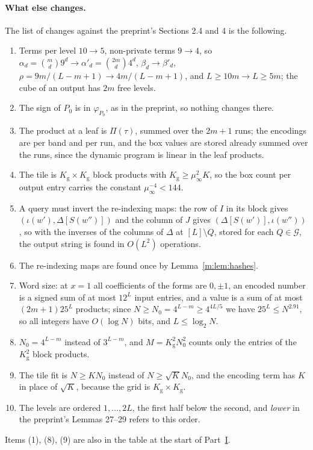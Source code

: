\documentclass[11pt]{article}
\theoremstyle{definition}
\theoremstyle{remark}
\newcommand{\Nz}{N_0}
\newcommand{\Qg}{\mathcal{G}}
\newcommand{\Kg}{K_{\mathrm g}}
\begin{document}
\paragraph{What else changes.} The list of changes against the preprint's Sections 2.4 and 4 is the following.
\begin{enumerate}[label=(\arabic*),nosep]
\item Terms per level $10\to5$, non-private terms $9\to4$, so $\alpha_d=\binom md9^d\to\alpha'_d=\binom{2m}d4^d$, $\beta_d\to\beta'_d$, $\rho=9m/(L-m+1)\to4m/(L-m+1)$, and $L\ge10m\to L\ge5m$; the cube of an output has $2m$ free levels.
\item The sign of $P_0$ is in $\varphi_{P_0}$, as in the preprint, so nothing changes there.
\item The product at a leaf is $\Pi(\tau)$, summed over the $2m+1$ runs; the encodings are per band and per run, and the box values are stored already summed over the runs, since the dynamic program is linear in the leaf products.
\item The tile is $\Kg\times\Kg$ block products with $\Kg\ge\mu_\infty^2 K$, so the box count per output entry carries the constant $\mu_\infty^{-4}<144$.
\item A query must invert the re-indexing maps: the row of $I$ in its block gives $(\iota(w'),\Delta[S(w'')])$ and the column of $J$ gives $(\Delta[S(w')],\iota(w''))$, so with the inverses of the columns of $\Delta$ at $[L]\setminus Q$, stored for each $Q\in\Qg$, the output string is found in $O(L^2)$ operations.
\item The re-indexing maps are found once by Lemma~\ref{m:lem:hashes}.
\item Word size: at $x=1$ all coefficients of the forms are $0,\pm1$, an encoded number is a signed sum of at most $12^L$ input entries, and a value is a sum of at most $(2m+1)25^L$ products; since $N\ge\Nz=4^{L-m}\ge4^{4L/5}$ we have $25^L\le N^{2.91}$, so all integers have $O(\log N)$ bits, and $L\le\log_2 N$.
\item $\Nz=4^{L-m}$ instead of $3^{L-m}$, and $M=\Kg^2\Nz^2$ counts only the entries of the $\Kg^2$ block products.
\item The tile fit is $N\ge K\Nz$ instead of $N\ge\sqrt K\Nz$, and the encoding term has $K$ in place of $\sqrt K$, because the grid is $\Kg\times\Kg$.
\item The levels are ordered $1,\dots,2L$, the first half below the second, and \emph{lower} in the preprint's Lemmas 27--29 refers to this order.
\end{enumerate}
Items (1), (8), (9) are also in the table at the start of Part~\hyperref[m:partI]{I}.
\end{document}
